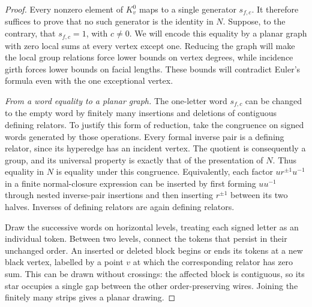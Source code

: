 \begin{proof}
Every nonzero element of $K_v^0$ maps to a single generator $s_{f,c}$.
It therefore suffices to prove that no such generator is the identity
in $N$.  Suppose, to the contrary, that $s_{f,c}=1$, with $c\ne0$.
We will encode this equality by a planar graph with zero local sums
at every vertex except one.  Reducing the graph will make the local
group relations force lower bounds on vertex degrees, while incidence
girth forces lower bounds on facial lengths.  These bounds will
contradict Euler's formula even with the one exceptional vertex.

\emph{From a word equality to a planar graph.}
The one-letter word $s_{f,c}$ can be changed to the empty word by
finitely many insertions and deletions of contiguous defining
relators.  To justify this form of reduction, take the congruence on
signed words generated by those operations.  Every formal inverse
pair is a defining relator, since its hyperedge has an incident
vertex.  The quotient is consequently a group, and its universal
property is exactly that of the presentation of $N$.  Thus equality
in $N$ is equality under this congruence.  Equivalently, each factor
$u r^{\pm1}u^{-1}$ in a finite normal-closure expression can be
inserted by first forming $u u^{-1}$ through nested inverse-pair
insertions and then inserting $r^{\pm1}$ between its two halves.
Inverses of defining relators are again defining relators.

Draw the successive words on horizontal levels, treating each signed
letter as an individual token.  Between two levels, connect the
tokens that persist in their unchanged order.  An inserted or deleted
block begins or ends its tokens at a new black vertex, labelled by a
point $v$ at which the corresponding relator has zero sum.  This can
be drawn without crossings: the affected block is contiguous, so its
star occupies a single gap between the other order-preserving wires.
Joining the finitely many strips gives a planar drawing.


\end{proof}
